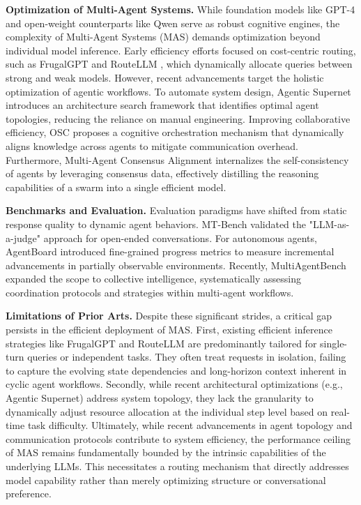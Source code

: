 \documentclass{article}
\theoremstyle{plain}
\theoremstyle{definition}
\theoremstyle{remark}
\begin{document}
\textbf{Optimization of Multi-Agent Systems.} While foundation models like GPT-4 \cite{achiam2023gpt} and open-weight counterparts like Qwen \cite{bai2023qwen} serve as robust cognitive engines, the complexity of Multi-Agent Systems (MAS) demands optimization beyond individual model inference. Early efficiency efforts focused on cost-centric routing, such as FrugalGPT \cite{chen2023frugalgpt} and RouteLLM \cite{ong2024routellm}, which dynamically allocate queries between strong and weak models. However, recent advancements target the holistic optimization of agentic workflows. To automate system design, Agentic Supernet\cite{zhang2025multi} introduces an architecture search framework that identifies optimal agent topologies, reducing the reliance on manual engineering. Improving collaborative efficiency, OSC\cite{zhang2025osc} proposes a cognitive orchestration mechanism that dynamically aligns knowledge across agents to mitigate communication overhead. Furthermore, Multi-Agent Consensus Alignment\cite{samanta2025internalizing} internalizes the self-consistency of agents by leveraging consensus data, effectively distilling the reasoning capabilities of a swarm into a single efficient model.

\textbf{Benchmarks and Evaluation.} Evaluation paradigms have shifted from static response quality to dynamic agent behaviors. MT-Bench \cite{zheng2023judging} validated the "LLM-as-a-judge" approach for open-ended conversations. For autonomous agents, AgentBoard \cite{chang2024agentboard} introduced fine-grained progress metrics to measure incremental advancements in partially observable environments. Recently, MultiAgentBench \cite{zhu2025multiagentbench} expanded the scope to collective intelligence, systematically assessing coordination protocols and strategies within multi-agent workflows.

\textbf{Limitations of Prior Arts.} Despite these significant strides, a critical gap persists in the efficient deployment of MAS. First, existing efficient inference strategies like FrugalGPT and RouteLLM are predominantly tailored for single-turn queries or independent tasks. They often treat requests in isolation, failing to capture the evolving state dependencies and long-horizon context inherent in cyclic agent workflows. Secondly, while recent architectural optimizations (e.g., Agentic Supernet) address system topology, they lack the granularity to dynamically adjust resource allocation at the individual step level based on real-time task difficulty. Ultimately, while recent advancements in agent topology and communication protocols contribute to system efficiency, the performance ceiling of MAS remains fundamentally bounded by the intrinsic capabilities of the underlying LLMs\cite{zhu2025multiagentbench}. This necessitates a routing mechanism that directly addresses model capability rather than merely optimizing structure or conversational preference.
\end{document}
